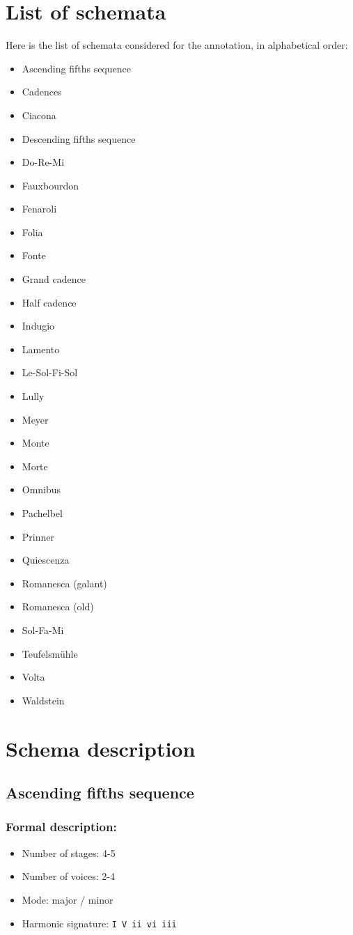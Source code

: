 \documentclass[11pt, openany]{article}
\begin{document}
\section{List of schemata}
Here is the list of schemata considered for the annotation, in alphabetical order:
\begin{itemize}
    \setlength\itemsep{1pt}
\item Ascending fifths sequence
\item Cadences
\item Ciacona
\item Descending fifths sequence
\item Do-Re-Mi
\item Fauxbourdon
\item Fenaroli
\item Folia
\item Fonte
\item Grand cadence
\item Half cadence
\item Indugio
\item Lamento
\item Le-Sol-Fi-Sol
\item Lully
\item Meyer
\item Monte
\item Morte
\item Omnibus
\item Pachelbel
\item Prinner
\item Quiescenza
\item Romanesca (galant)
\item Romanesca (old)
\item Sol-Fa-Mi
\item Teufelsmühle
\item Volta
\item Waldstein
\end{itemize}


\section{Schema description}


	\subsection{Ascending fifths sequence}
	
\subsubsection{Formal description:}
\begin{itemize}
\item Number of stages: 4-5
\item Number of voices: 2-4
\item Mode: major / minor
\item Harmonic signature: \texttt{I V ii vi iii}
\end{itemize}
\end{document}
